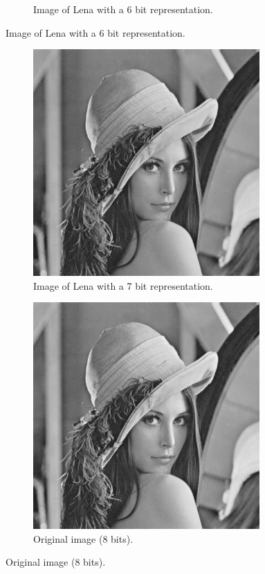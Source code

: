 \documentclass{article}
\theoremstyle{problemstyle}
\begin{document}
\begin{problem}
\begin{figure}[H]
\begin{subfigure}{.45\textwidth}
		\caption{Image of Lena with a 6 bit representation.}
		\label{fig:lena_b6}
	\end{subfigure}
\end{figure}
\begin{figure}[H]
	\begin{subfigure}{.45\textwidth}
		\centering
		\includegraphics[width=0.95\textwidth]{lena_b7.png}
		\caption{Image of Lena with a 7 bit representation.}
		\label{fig:lena_b7}
	\end{subfigure}
	\hfill
	\begin{subfigure}{.45\textwidth}
		\centering
		\includegraphics[width=0.95\textwidth]{lena_ascii.png}
		\caption{Original image (8 bits).}
	\end{subfigure}
\end{figure}
\end{problem}
\end{document}
